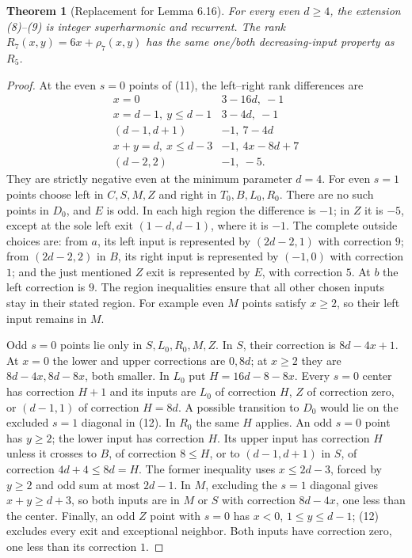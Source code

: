 \documentclass[11pt]{article}
\newtheorem{theorem}{Theorem}
\begin{document}
\begin{theorem}[Replacement for Lemma 6.16]
For every even $d\ge4$, the extension (8)--(9) is integer superharmonic
and recurrent. The rank $R_7(x,y)=6x+\rho_7(x,y)$ has the same one/both
decreasing-input property as $R_5$.
\end{theorem}
\begin{proof}
At the even $s=0$ points of (11), the left--right rank differences are
\[
\begin{array}{c|c}
x=0&3-16d,\ -1\\
x=d-1,\ y\le d-1&3-4d,\ -1\\
(d-1,d+1)&-1,\ 7-4d\\
x+y=d,\ x\le d-3&-1,\ 4x-8d+7\\
(d-2,2)&-1,\ -5.
\end{array}                                                    \tag{14}
\]
They are strictly negative even at the minimum parameter $d=4$.
For even $s=1$ points choose left in $C,S,M,Z$ and right in
$T_0,B,L_0,R_0$. There are no such points in $D_0$, and $E$ is odd.
In each high region the difference is $-1$; in $Z$ it is $-5$, except
at the sole left exit $(1-d,d-1)$, where it is $-1$.
The complete outside choices are: from $a$, its left input is represented
by $(2d-2,1)$ with correction $9$; from $(2d-2,2)$ in $B$, its right
input is represented by $(-1,0)$ with correction $1$; and the just
mentioned $Z$ exit is represented by $E$, with correction $5$.
At $b$ the left correction is $9$. The region inequalities ensure that
all other chosen inputs stay in their stated region. For example even
$M$ points satisfy $x\ge2$, so their left input remains in $M$.

Odd $s=0$ points lie only in $S,L_0,R_0,M,Z$. In $S$, their correction
is $8d-4x+1$. At $x=0$ the lower and upper corrections are $0,8d$;
at $x\ge2$ they are $8d-4x,8d-8x$, both smaller. In $L_0$ put
$H=16d-8-8x$. Every $s=0$ center has correction $H+1$ and its inputs
are $L_0$ of correction $H$, $Z$ of correction zero, or $(d-1,1)$ of
correction $H=8d$. A possible transition to $D_0$ would lie on the
excluded $s=1$ diagonal in (12).
In $R_0$ the same $H$ applies. An odd $s=0$ point has $y\ge2$; the
lower input has correction $H$. Its upper input has correction $H$
unless it crosses to $B$, of correction $8\le H$, or to $(d-1,d+1)$
in $S$, of correction $4d+4\le8d=H$. The former inequality uses
$x\le2d-3$, forced by $y\ge2$ and odd sum at most $2d-1$.
In $M$, excluding the $s=1$ diagonal gives $x+y\ge d+3$, so both inputs
are in $M$ or $S$ with correction $8d-4x$, one less than the center.
Finally, an odd $Z$ point with $s=0$ has $x<0$, $1\le y\le d-1$;
(12) excludes every exit and exceptional neighbor. Both inputs have
correction zero, one less than its correction $1$.


\end{proof}
\end{document}
